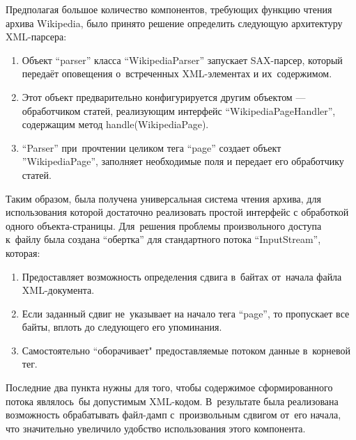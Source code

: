 Предполагая большое количество компонентов, требующих функцию чтения архива Wikipedia,
было принято решение определить следующую архитектуру XML-парсера:

\begin{enumerate}

\item{
Объект ``parser'' класса ``WikipediaParser'' запускает SAX-парсер, 
который передаёт оповещения о~встреченных XML-элементах и их~содержимом.
}

\item {
Этот объект предварительно конфигурируется другим объектом --- обработчиком статей,
 реализующим интерфейс ``WikipediaPageHandler'', 
содержащим метод handle(WikipediaPage).
}

\item{
``Parser'' при~прочтении целиком тега ``page'' создает объект ''WikipediaPage'', 
заполняет необходимые поля и передает его обработчику статей.
}

\end{enumerate}


Таким образом, была получена универсальная система чтения архива, 
для использования которой достаточно реализовать простой интерфейс с обработкой одного объекта-страницы.
Для~решения проблемы произвольного доступа к~файлу была создана ``обертка'' для стандартного потока ``InputStream'', которая:

\begin{enumerate}

\item{
Предоставляет возможность определения сдвига в~байтах от~начала файла XML-документа.
}

\item {
Если заданный сдвиг не~указывает на начало тега ``page'', 
то пропускает все байты, 
вплоть до следующего его упоминания.
}

\item{
Самостоятельно “оборачивает" предоставляемые потоком данные в~корневой тег.
}

\end{enumerate}

Последние два пункта нужны для того, чтобы содержимое сформированного потока являлось~бы допустимым XML-кодом.
В~результате была реализована возможность обрабатывать файл-дамп с~произвольным сдвигом от~его начала, 
что значительно увеличило удобство использования этого компонента.  


